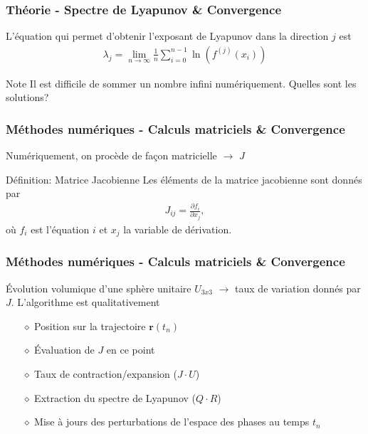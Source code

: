 \begin{frame}
    \frametitle{Théorie - Spectre de Lyapunov \& Convergence}
    L'équation qui permet d'obtenir l'exposant de Lyapunov dans la direction $j$ est
    \begin{align}
        \lambda_{j} = \lim_{n\to\infty}\frac{1}{n}\sum_{i = 0}^{n - 1}\ln(f^{(j)}(x_i))
    \end{align}
    \vspace{0.5cm}
    \begin{noteblock}{Note}
        Il est difficile de sommer un nombre infini numériquement. Quelles sont les solutions?
    \end{noteblock}
\end{frame}

\begin{frame}
    \begin{center}
    \vspace{0.5cm}
    \end{center}
\end{frame}

\begin{frame}
    \frametitle{Méthodes numériques - Calculs matriciels \& Convergence}
    Numériquement, on procède de façon matricielle $\to$ $J$
    \vspace{0.5cm}
    \begin{defblock}{Définition: Matrice Jacobienne}
        Les éléments de la matrice jacobienne sont donnés par
        \begin{align}
            J_{ij} = \frac{\partial f_i}{\partial x_j},
        \end{align}
        où $f_i$ est l'équation $i$ et $x_j$ la variable de dérivation.
    \end{defblock}
\end{frame}

\begin{frame}
    \frametitle{Méthodes numériques - Calculs matriciels \& Convergence}
    Évolution volumique d'une sphère unitaire $U_{3x3}$ $\to$ taux de variation donnés par $J$. L'algorithme est qualitativement \pause
    \vspace{0.5cm}
    \begin{itemize}
        \setlength\itemsep{1em}
        \item[$\diamond$] Position sur la trajectoire $\bm{r}(t_n)$ \pause
        \item[$\diamond$] Évaluation de $J$ en ce point \pause
        \item[$\diamond$] Taux de contraction/expansion ($J\cdot U$) \pause
        \item[$\diamond$] Extraction du spectre de Lyapunov ($Q\cdot R$) \pause
        \item[$\diamond$] Mise à jours des perturbations de l'espace des phases au temps $t_n$
    \end{itemize}
\end{frame}

